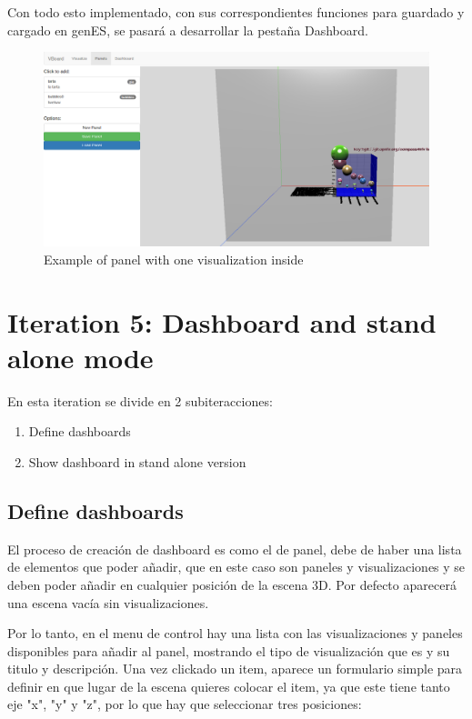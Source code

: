 \documentclass[a4paper, 12pt]{book}
\begin{document}
Con todo esto implementado, con sus correspondientes funciones para guardado y cargado en genES, se pasará a desarrollar la pestaña Dashboard.

\begin{figure}[H]
  \centering
  \includegraphics[width=16cm, keepaspectratio]{img/development/examplepanelbubbles}
  \caption{Example of panel with one visualization inside}
  \label{fig:examplepanelbubbles}
\end{figure}

\section{Iteration 5: Dashboard and stand alone mode}

En esta iteration se divide en 2 subiteracciones:

\begin{enumerate}
    \item Define dashboards
    \item Show dashboard in stand alone version
\end{enumerate}

\subsection{Define dashboards}

El proceso de creación de dashboard es como el de panel, debe de haber una lista de elementos que poder añadir, que en este caso son paneles y visualizaciones y se deben poder añadir en cualquier posición de la escena 3D. Por defecto aparecerá una escena vacía sin visualizaciones.

Por lo tanto, en el menu de control hay una lista con las visualizaciones y paneles disponibles para añadir al panel, mostrando el tipo de visualización que es y su titulo y descripción. Una vez clickado un item, aparece un formulario simple para definir en que lugar de la escena quieres colocar el item, ya que este tiene tanto eje "x", "y" y "z", por lo que hay que seleccionar tres posiciones:
\end{document}
